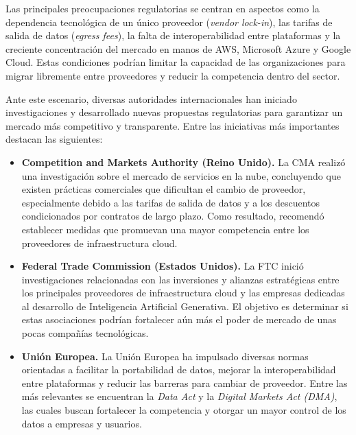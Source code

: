 \documentclass[12pt,a4paper]{article}
\begin{document}
Las principales preocupaciones regulatorias se centran en aspectos como la dependencia tecnológica de un único proveedor (\textit{vendor lock-in}), las tarifas de salida de datos (\textit{egress fees}), la falta de interoperabilidad entre plataformas y la creciente concentración del mercado en manos de AWS, Microsoft Azure y Google Cloud. Estas condiciones podrían limitar la capacidad de las organizaciones para migrar libremente entre proveedores y reducir la competencia dentro del sector.\parencite{cma2025}

Ante este escenario, diversas autoridades internacionales han iniciado investigaciones y desarrollado nuevas propuestas regulatorias para garantizar un mercado más competitivo y transparente. Entre las iniciativas más importantes destacan las siguientes:

\begin{itemize}

\item \textbf{Competition and Markets Authority (Reino Unido).} La CMA realizó una investigación sobre el mercado de servicios en la nube, concluyendo que existen prácticas comerciales que dificultan el cambio de proveedor, especialmente debido a las tarifas de salida de datos y a los descuentos condicionados por contratos de largo plazo. Como resultado, recomendó establecer medidas que promuevan una mayor competencia entre los proveedores de infraestructura cloud.\parencite{cma2025}

\item \textbf{Federal Trade Commission (Estados Unidos).} La FTC inició investigaciones relacionadas con las inversiones y alianzas estratégicas entre los principales proveedores de infraestructura cloud y las empresas dedicadas al desarrollo de Inteligencia Artificial Generativa. El objetivo es determinar si estas asociaciones podrían fortalecer aún más el poder de mercado de unas pocas compañías tecnológicas.\parencite{ftc_ai_2024}

\item \textbf{Unión Europea.} La Unión Europea ha impulsado diversas normas orientadas a facilitar la portabilidad de datos, mejorar la interoperabilidad entre plataformas y reducir las barreras para cambiar de proveedor. Entre las más relevantes se encuentran la \textit{Data Act} y la \textit{Digital Markets Act (DMA)}, las cuales buscan fortalecer la competencia y otorgar un mayor control de los datos a empresas y usuarios.\parencite{eu_data_act_2023,eu_dma_2022}

\end{itemize}
\end{document}
